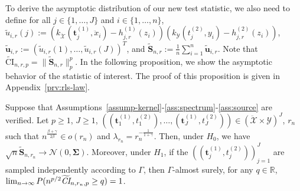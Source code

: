 To derive the asymptotic distribution of our new test statistic, we also need to define for all $j\in\{1,\dots,J\}$ and $i\in\{1,\dots,n\}$,
    $\widetilde{u}_{i,r}(j):= (k_{\mathcal{\ddot{X}}}(\mathbf{t}^{(1)}_j,\ddot{x}_i)- h^{(1)}_{j,r}(z_i))
    (k_{\mathcal{Y}}(t^{(2)}_j,y_i)- h^{(2)}_{j,r}(z_i))$,
$\widetilde{\mathbf{u}}_{i,r}:=(\widetilde{u}_{i,r}(1),\dots,\widetilde{u}_{i,r}(J))^T$, and $\widetilde{\mathbf{S}}_{n,r}:=\frac{1}{n}\sum_{i=1}^n  \widetilde{\mathbf{u}}_{i,r}$. Note that $\widetilde{\text{CI}}_{n,r,p}=\lVert\widetilde{\mathbf{S}}_{n,r}\rVert_p^p$. 
In the following proposition, we show the asymptotic behavior of the statistic of interest. The proof of this proposition is given in Appendix~\ref{prv:rls-law}.
\begin{prop} 
\label{prop:rls-law}
Suppose that Assumptions~\ref{assump-kernel}-\ref{ass:spectrum}-\ref{ass:source} are verified. Let $p\geq 1$, $J\geq 1$, $((\mathbf{t}^{(1)}_1,t^{(2)}_1),\dots,(\mathbf{t}^{(1)}_J,t^{(2)}_J))\in(\mathcal{\ddot{X}}\times\mathcal{Y})^J$, $r_n$ such that $n^{\frac{\beta+\gamma}{2\beta}}\in o(r_n)$ and $\lambda_{r_n}=r_n^{-\frac{1}{1+\gamma}}$. Then, under $H_0$, we have $\sqrt{n}\widetilde{\mathbf{S}}_{n,r_n}\rightarrow \mathcal{N}(0,\bm{\Sigma})$. Moreover, under $H_1$, if  the $((\mathbf{t}^{(1)}_j,t^{(2)}_j))_{j=1}^J$ are sampled independently according to $\Gamma$, then $\Gamma$-almost surely, for any $q\in\mathbb{R}$, $\lim_{n\rightarrow\infty}P( n^{p/2}\widetilde{\emph{CI}}_{n,r_n,p} \geq q)=1$.
\end{prop}

